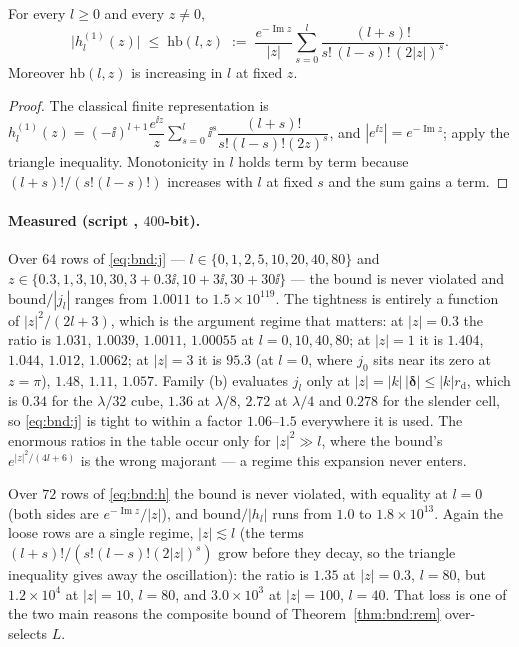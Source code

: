 \begin{theorem}
\label{thm:bnd:h}
For every $l \ge 0$ and every $z \neq 0$,
\begin{equation}
\bigl|h^{(1)}_l(z)\bigr| \;\le\; \mathrm{hb}(l,z) \;:=\;
\frac{e^{-\operatorname{Im}z}}{|z|}\sum_{s=0}^{l}
\frac{(l+s)!}{s!\,(l-s)!\,(2|z|)^{s}} .
\label{eq:bnd:h}
\end{equation}
Moreover $\mathrm{hb}(l,z)$ is increasing in $l$ at fixed $z$.
\end{theorem}

\begin{proof}
The classical finite representation is
$h^{(1)}_l(z) = (-\ii)^{l+1}\dfrac{e^{\ii z}}{z}\sum_{s=0}^{l}\ii^{s}
\dfrac{(l+s)!}{s!(l-s)!(2z)^{s}}$, and $|e^{\ii z}| = e^{-\operatorname{Im}z}$; apply the
triangle inequality. Monotonicity in $l$ holds term by term because
$(l+s)!/(s!(l-s)!)$ increases with $l$ at fixed $s$ and the sum gains a term.
\end{proof}

\paragraph{Measured (script , $400$-bit).} Over $64$ rows of
\eqref{eq:bnd:j} --- $l \in \{0,1,2,5,10,20,40,80\}$ and $z \in \{0.3, 1, 3, 10, 30,
3+0.3\ii, 10+3\ii, 30+30\ii\}$ --- the bound is never violated and
$\mathrm{bound}/|j_l|$ ranges from $1.0011$ to $1.5\times10^{119}$. The tightness is
entirely a function of $|z|^2/(2l+3)$, which is the argument regime that matters: at
$|z| = 0.3$ the ratio is $1.031$, $1.0039$, $1.0011$, $1.00055$ at $l = 0, 10, 40, 80$; at
$|z| = 1$ it is $1.404$, $1.044$, $1.012$, $1.0062$; at $|z| = 3$ it is $95.3$ (at
$l = 0$, where $j_0$ sits near its zero at $z = \pi$), $1.48$, $1.11$, $1.057$. Family
(b) evaluates $j_l$ only at $|z| = |k|\,|\boldsymbol{\delta}| \le |k| r_{\mathrm{d}}$,
which is $0.34$ for the $\lambda/32$ cube, $1.36$ at $\lambda/8$, $2.72$ at $\lambda/4$
and $0.278$ for the slender cell, so \eqref{eq:bnd:j} is tight to within a factor
$1.06$--$1.5$ everywhere it is used. The enormous ratios in the table occur only for
$|z|^2 \gg l$, where the bound's $e^{|z|^2/(4l+6)}$ is the wrong majorant --- a regime
this expansion never enters.

Over $72$ rows of \eqref{eq:bnd:h} the bound is never violated, with equality at $l = 0$
(both sides are $e^{-\operatorname{Im}z}/|z|$), and $\mathrm{bound}/|h_l|$ runs from
$1.0$ to $1.8\times10^{13}$. Again the loose rows are a single regime, $|z| \lesssim l$
(the terms $(l+s)!/(s!(l-s)!(2|z|)^s)$ grow before they decay, so the triangle inequality
gives away the oscillation): the ratio is $1.35$ at $|z| = 0.3$, $l = 80$, but
$1.2\times10^{4}$ at $|z| = 10$, $l = 80$, and $3.0\times10^{3}$ at $|z| = 100$,
$l = 40$. That loss is one of the two main reasons the composite bound of
Theorem~\ref{thm:bnd:rem} over-selects $L$.


